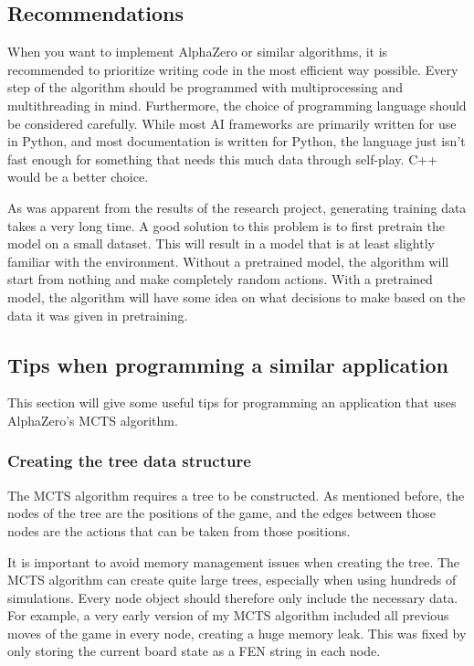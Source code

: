 \documentclass{article}
\begin{document}
\subsection{Recommendations}

When you want to implement AlphaZero or similar algorithms, it is recommended to
prioritize writing code in the most efficient way possible. Every step of the algorithm
should be programmed with multiprocessing and multithreading in mind. Furthermore,
the choice of programming language should be considered carefully. While most AI 
frameworks are primarily written for use in Python, and most documentation is written
for Python, the language just isn't fast enough for something that needs this much data through self-play. 
C++ would be a better choice.

As was apparent from the results of the research project, generating training data 
takes a very long time. A good solution to this problem is to first pretrain the model
on a small dataset. This will result in a model that is at least slightly familiar 
with the environment. Without a pretrained model, the algorithm will start from nothing
and make completely random actions. With a pretrained model, the algorithm will have some 
idea on what decisions to make based on the data it was given in pretraining.

\subsection{Tips when programming a similar application}

This section will give some useful tips for programming an application that uses
AlphaZero's MCTS algorithm. 

\subsubsection{Creating the tree data structure}

The MCTS algorithm requires a tree to be constructed. As mentioned before, the nodes of the tree
are the positions of the game, and the edges between those nodes are the actions that can be taken
from those positions. 

It is important to avoid memory management issues when creating the tree. The MCTS algorithm 
can create quite large trees, especially when using hundreds of simulations. Every node object
should therefore only include the necessary data. For example, a very early version of my MCTS algorithm 
included all previous moves of the game in every node, creating a huge memory leak. This was fixed
by only storing the current board state as a FEN string in each node.
\end{document}
